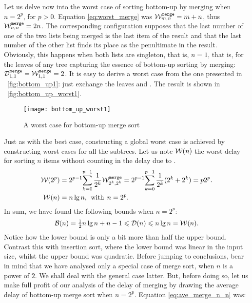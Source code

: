 Let us delve now into the worst case of sorting bottom\hyp{}up by
merging when \(n=2^p\), for \(p>0\). Equation \eqref{eq:worst_merge}
 was \(\worst{merge}{m,n} = m + n\), thus
\(\worst{merge}{n,n} = 2n\). The corresponding configuration supposes
that the last number of one of the two lists being merged is the last
item of the result and that the last number of the other list finds
its place as the penultimate in the result. Obviously, this happens
when both lists are singleton, that is, \(n=1\), that is, for the leaves
of any tree capturing the essence of bottom\hyp{}up sorting by
merging: \(\comp{merge}{1,1} = \worst{merge}{1,1} = 2\). It is easy to
derive a worst case from the one presented in
\fig~\vref{fig:bottom_up1}: just exchange the leaves \erlcode{[4]} and
\erlcode{[6]}. The result is shown in
\fig~\vref{fig:bottom_up_worst1}.
\begin{figure}
\centering
\texttt{[image: bottom\_up\_worst1]}
\caption{A worst case for bottom\hyp{}up merge sort
\label{fig:bottom_up_worst1}}
\end{figure}
Just as with the best case, constructing a global worst case is
achieved by constructing worst cases for all the subtrees. Let us note
\(\Wideal(n)\) the worst delay for sorting \(n\) items without
counting in the delay due to .
\begin{align}
\Wideal(2^p)
  &= 2^{p-1}\!\sum_{k=0}^{p-1}{\frac{1}{2^k}\worst{merge}{2^k,2^k}}
  = 2^{p-1}\!\sum_{k=0}^{p-1}{\frac{1}{2^k}(2^k+2^k)}
  = p2^p.\label{eq:worst_power}\\
\Wideal(n)
  &= n\lg n,\;\, \text{with} \,\; n = 2^p.\notag
\end{align}
In sum, we have found the following bounds when \(n=2^p\):
\begin{equation}
\Bideal(n) = \tfrac{1}{2}{n \lg n} + n - 1
\leqslant \Dideal(n) \leqslant 
n \lg n = \Wideal(n).\label{ineq:D}
\end{equation}
Notice how the lower bound is only a bit more than half the upper
bound. Contrast this with insertion sort, where the lower bound was
linear in the input size, whilst the upper bound was quadratic. Before
jumping to conclusions, bear in mind that we have analysed only a
special case of merge sort, when \(n\) is a power of \(2\). We shall
deal with the general case latter. But, before doing so, let us make
full profit of our analysis of the delay of merging by drawing the
average delay of bottom\hyp{}up merge sort when \(n=2^p\). Equation
\eqref{eq:ave_merge_n_n}  was:
